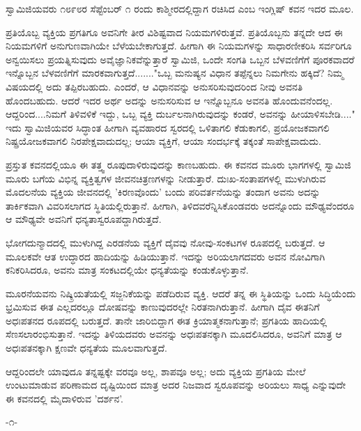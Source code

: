 ಸ್ವಾಮಿಜಿಯವರು ೧೮೯೮ರ ಸೆಪ್ಟೆಂಬರ್ ೧ ರಂದು ಕಾಶ್ಮೀರದಲ್ಲಿದ್ದಾಗ ರಚಿಸಿದ  ಎಂಬ ಇಂಗ್ಲಿಷ್ ಕವನ ಇದರ ಮೂಲ.

ಪ್ರತಿಯೊಬ್ಬ ವ್ಯಕ್ತಿಯ ಪ್ರಗತಿಗೂ ಅವನಿಗೇ ತೀರ ವಿಶಿಷ್ಟವಾದ ನಿಯಮಗಳಿರುತ್ತವೆ. ಪ್ರತಿಯೊಬ್ಬನು ತನ್ನದೇ ಆದ ಈ ನಿಯಮಗಳಿಗೆ ಅನುಗುಣವಾಗಿಯೇ ಬೆಳೆಯಬೇಕಾಗುತ್ತದೆ. ಹೀಗಾಗಿ ಈ ನಿಯಮಗಳನ್ನು ಸಾಧಾರಣೀಕರಿಸಿ ಸರ್ವರಿಗೂ ಅನ್ವಯಿಸಲು ಪ್ರಯತ್ನಿಸುವುದು ಅವೈಜ್ಞಾನಿಕವೆನ್ನುತ್ತಾರೆ ಸ್ವಾಮಿಜಿ, ಒಂದೇ ಸಂಗತಿ ಒಬ್ಬನ ಬೆಳವಣಿಗೆಗೆ ಪೂರಕವಾದರೆ ಇನ್ನೊಬ್ಬನ ಬೆಳವಣಿಗೆಗೆ ಮಾರಕವಾಗುತ್ತದೆ......."ಒಬ್ಬ ಮನುಷ್ಯನ ವಿಧಾನ ತಪ್ಪೆನ್ನಲು ನಿಮಗೇನು ಹಕ್ಕಿದೆ? ನಿಮ್ಮ ವಿಷಯದಲ್ಲಿ ಅದು ತಪ್ಪಿರಬಹುದು. ಎಂದರೆ, ಆ ವಿಧಾನವನ್ನು ಅನುಸರಿಸುವುದರಿಂದ ನೀವು ಅವನತಿ ಹೊಂದಬಹುದು. ಆದರೆ ಇದರ ಅರ್ಥ ಅದನ್ನು ಅನುಸರಿಸುವ ಆ ಇನ್ನೊಬ್ಬನೂ ಅವನತಿ ಹೊಂದುವನೆಂದಲ್ಲ. ಆದ್ದರಿಂದ....ನಿಮಗೆ ತಿಳಿವಳಿಕೆ ಇದ್ದು, ಒಬ್ಬ ವ್ಯಕ್ತಿ ದುರ್ಬಲನಾಗಿರುವುದನ್ನು ಕಂಡರೆ, ಅವನನ್ನು ಹೀಯಾಳಿಸಬೇಡಿ...." ಇದು ಸ್ವಾಮಿಜಿಯವರ ಸಿದ್ಧಾಂತ  ಹೀಗಾಗಿ ವ್ಯವಹಾರದ ಸ್ವರದಲ್ಲಿ ಒಳಿತಾಗಲಿ ಕೆಡುಕಾಗಲಿ, ಪ್ರಯೋಜಕವಾಗಲಿ ನಿಷ್ಪ್ರಯೋಜಕವಾಗಲಿ ನಿರಪೇಕ್ಷವಾದುದಲ್ಲ; ಆಯಾ ವ್ಯಕ್ತಿಗೆ, ಆಯಾ ಸಂದರ್ಭಕ್ಕೆ ತಕ್ಕಂತೆ ಸಾಪೇಕ್ಷವಾದುದು.

ಪ್ರಸ್ತುತ ಕವನದಲ್ಲಿಯೂ ಈ ತತ್ತ್ವ ರೂಪುದಾಳಿರುವುದನ್ನು ಕಾಣಬಹುದು. ಈ ಕವನದ ಮೂರು ಭಾಗಗಳಲ್ಲಿ ಸ್ವಾಮಿಜಿ ಮೂರು ಬಗೆಯ ವಿಭಿನ್ನ ವ್ಯಕ್ತಿತ್ವಗಳ ಜೀವನಚಿತ್ರಣಗಳನ್ನು ನೀಡುತ್ತಾರೆ. ದುಃಖ-ಸಂತಾಪಗಳಲ್ಲಿ ಮುಳುಗಿರುವ ಮೊದಲನೆಯ ವ್ಯಕ್ತಿಯ ಜೀವನದಲ್ಲಿ 'ಕಿರಣವೊಂದು' ಬಂದು ಪರಿವರ್ತನೆಯನ್ನು ತಂದಾಗ ಅವನು ಅದನ್ನು ತಾರ್ಕಿಕವಾಗಿ ವಿವರಿಸಲಾಗದ ಸ್ಥಿತಿಯಲ್ಲಿರುತ್ತಾನೆ. ಹೀಗಾಗಿ, ತಿಳಿದವರೆನ್ನಿಸಿಕೊಂಡವರು ಅದನ್ನೊಂದು ಮೌಢ್ಯವೆಂದರೂ ಆ ಮೌಢ್ಯವೇ ಅವನಿಗೆ ಧನ್ಯತಾಸ್ವರೂಪದ್ದಾಗಿರುತ್ತದೆ.

ಭೋಗದುನ್ಮಾದದಲ್ಲಿ ಮುಳುಗಿದ್ದ ಎರಡನೆಯ ವ್ಯಕ್ತಿಗೆ ದೈವವು ನೋವು-ಸಂಕಟಗಳ ರೂಪದಲ್ಲಿ ಬರುತ್ತದೆ. ಆ ಮೂಲಕವೇ ಆತ ಉದ್ಧಾರದ ಹಾದಿಯನ್ನು ಹಿಡಿಯುತ್ತಾನೆ. ಇದನ್ನು ಅರಿಯಲಾಗದವರು ಅವನ ನೋವಿಗಾಗಿ ಕನಿಕರಿಸಿದರೂ, ಅವನು ಮಾತ್ರ ಸಂಕಟದಲ್ಲಿಯೇ ಧನ್ಯತೆಯನ್ನು ಕಂಡುಕೊಳ್ಳುತ್ತಾನೆ.

ಮೂರನೆಯವನು ನಿಷ್ಕ್ರಿಯತೆಯಲ್ಲಿ ಸಜ್ಜನಿಕೆಯನ್ನು ಪಡೆದಿರುವ ವ್ಯಕ್ತಿ. ಆದರೆ ತನ್ನ ಈ ಸ್ಥಿತಿಯನ್ನು ಒಂದು ಸಿದ್ಧಿಯೆಂದು ಭ್ರಮಿಸುವ ಈತ ಎಲ್ಲದರಲ್ಲೂ ದೋಷವನ್ನು ಕಾಣುವುದರಲ್ಲೇ ನಿರತನಾಗಿರುತ್ತಾನೆ. ಹೀಗಾಗಿ ದೈವ ಈತನಿಗೆ ಅಧಃಪತನದ ರೂಪದಲ್ಲಿ ಬರುತ್ತದೆ. ತಾನೇ ಜಾರಿಬಿದ್ದಾಗ ಈತ ಕ್ರಿಯಾತ್ಮಕನಾಗುತ್ತಾನೆ; ಪ್ರಗತಿಯ ಹಾದಿಯಲ್ಲಿ ಸೆಣಸಲಾರಂಭಿಸುತ್ತಾನೆ. ಇದನ್ನು ತಿಳಿಯದವರು ಅವನನ್ನು ಅಧಃಪತನಕ್ಕಾಗಿ ಮೂದಲಿಸಿದರೂ, ಅವನಿಗೆ ಮಾತ್ರ ಆ ಅಧಃಪತನಕ್ಕಾಗಿ ಕ್ಷಣವೇ ಧನ್ಯತೆಯ ಮೂಲವಾಗುತ್ತದೆ.

ಆದ್ದರಿಂದಲೇ ಯಾವುದೂ ತನ್ನಷ್ಟಕ್ಕೇ ವರವೂ ಅಲ್ಲ, ಶಾಪವೂ ಅಲ್ಲ; ಅದು ವ್ಯಕ್ತಿಯ ಪ್ರಗತಿಯ ಮೇಲೆ ಉಂಟುಮಾಡುವ ಪರಿಣಾಮದ ದೃಷ್ಟಿಯಿಂದ ಮಾತ್ರ ಅದರ ನಿಜವಾದ ಸ್ವರೂಪವನ್ನು ಅರಿಯಲು ಸಾಧ್ಯ ಎನ್ನುವುದೇ ಈ ಕವನದಲ್ಲಿ ಮೈದಾಳಿರುವ 'ದರ್ಶನ'.

\begin{center}
-೧-
\end{center}

